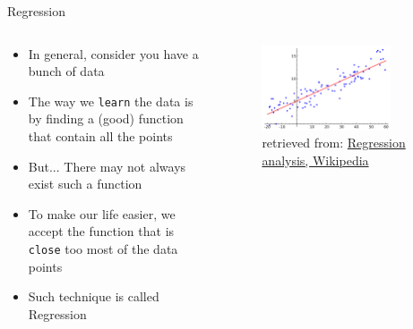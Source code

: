 \documentclass[10pt,xcolor={table,dvipsnames},t]{beamer}
\begin{document}
\begin{frame}{Regression}
  \begin{columns}
    \begin{column}[T]{0.6\textwidth}
      \begin{itemize}
        \item In general, consider you have a bunch of data
        \item The way we \texttt{learn} the data is by finding a (good) function that contain all the points
        \item But... There may not always exist such a function
        \item To make our life easier, we accept the function that is \texttt{close} too most of the data points
        \item Such technique is called Regression
      \end{itemize}
    \end{column}
    \begin{column}[T]{0.4\textwidth}
      \begin{figure}
        \includegraphics[width=0.8\textwidth]{img/Linear_regression.png}
        \caption{retrieved from: \href{https://en.wikipedia.org/wiki/Regression_analysis}{Regression analysis, Wikipedia}}
      \end{figure}
    \end{column}
  \end{columns}
\end{frame}
\end{document}
